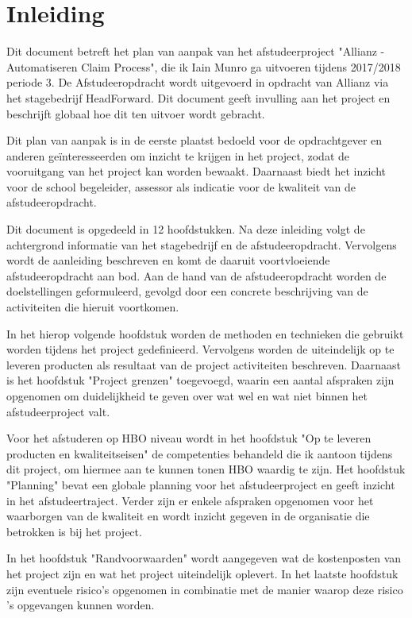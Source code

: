 \chapter{Inleiding}
Dit document betreft het plan van aanpak van het afstudeerproject "Allianz - Automatiseren Claim Process", die ik Iain Munro ga uitvoeren tijdens 2017/2018 periode 3. De Afstudeeropdracht wordt uitgevoerd in opdracht van Allianz via het stagebedrijf HeadForward. Dit document geeft invulling aan het project en beschrijft globaal hoe dit ten uitvoer wordt gebracht.\par
Dit plan van aanpak is in de eerste plaatst bedoeld voor de opdrachtgever en anderen geïnteresseerden om inzicht te krijgen in het project, zodat de vooruitgang van het project kan worden bewaakt. Daarnaast biedt het inzicht voor de school begeleider, assessor als indicatie voor de kwaliteit van de afstudeeropdracht.\par
Dit document is opgedeeld in 12 hoofdstukken. Na deze inleiding volgt de achtergrond informatie van het stagebedrijf en de afstudeeropdracht. Vervolgens wordt de aanleiding beschreven en komt de daaruit voortvloeiende afstudeeropdracht aan bod. Aan de hand van de afstudeeropdracht worden de doelstellingen geformuleerd, gevolgd door een concrete beschrijving van de activiteiten die hieruit voortkomen.\par
In het hierop volgende hoofdstuk worden de methoden en technieken die gebruikt worden tijdens het project gedefinieerd. Vervolgens worden de uiteindelijk op te leveren producten als resultaat van de project activiteiten beschreven. Daarnaast is het hoofdstuk "Project grenzen" toegevoegd, waarin een aantal afspraken zijn opgenomen om duidelijkheid te geven over wat wel en wat niet binnen het afstudeerproject valt.\par
Voor het afstuderen op HBO niveau wordt in het hoofdstuk "Op te leveren producten en kwaliteitseisen" de competenties behandeld die ik aantoon tijdens dit project, om hiermee aan te kunnen tonen HBO waardig te zijn. Het hoofdstuk "Planning" bevat een globale planning voor het afstudeerproject en geeft inzicht in het afstudeertraject. Verder zijn er enkele afspraken opgenomen voor het waarborgen van de kwaliteit en wordt inzicht gegeven in de organisatie die betrokken is bij het project.\par
In het hoofdstuk "Randvoorwaarden" wordt aangegeven wat de kostenposten van het project zijn en wat het project uiteindelijk oplevert. In het laatste hoofdstuk zijn eventuele risico's opgenomen in combinatie met de manier waarop deze risico 's opgevangen kunnen worden.